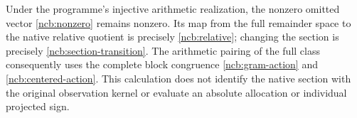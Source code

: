 Under the programme's injective arithmetic realization, the nonzero
omitted vector \eqref{ncb:nonzero} remains nonzero. Its map from the
full remainder space to the native relative quotient is precisely
\eqref{ncb:relative}; changing the section is precisely
\eqref{ncb:section-transition}. The arithmetic pairing of the full
class consequently uses the complete block congruence
\eqref{ncb:gram-action} and \eqref{ncb:centered-action}.
This calculation does not identify the native section with the
original observation kernel or evaluate an absolute allocation or
individual projected sign.
